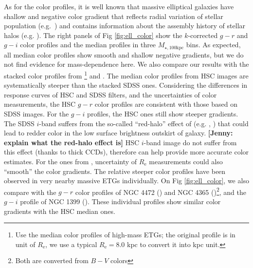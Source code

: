 \documentclass[a4paper,fleqn,usenatbib]{mnras}
\def\mtot{{$M_{\star,100\mathrm{kpc}}$}}
\newcommand{\jenny}[1]{\textcolor{Bittersweet}{\textbf{[Jenny: #1]}}}
\begin{document}
    As for the color profiles, it is well known that massive elliptical galaxies 
    have shallow and negative color gradient that reflects radial variation of 
    stellar population (e.g.\ \citealt{Carollo1993, LaBarbera2012}) and contains 
    information about the assembly history of stellar halos (e.g. 
    \citealt{Hirschmann2015}). 
    The right panels of Fig \ref{fig:ell_color} show the $k$-corrected $g-r$ and 
    $g-i$ color profiles and the median profiles in three \mtot{} bins. 
    As expected, all median color profiles show smooth and shallow negative 
    gradients, but we do not find evidence for mass-dependence here. 
    We also compare our results with the stacked color profiles from  
    \citealt{LaBarbera2010}\footnote{Use the median color profiles of high-mass 
    ETGs; the original profile is in unit of $R_{\mathrm{e}}$, we use a typical 
    $R_{\mathrm{e}}=8.0$ kpc to convert it into kpc unit.} and 
    \citealt{DSouza2014}.
    The median color profiles from HSC images are systematically steeper than the 
    stacked SDSS ones. 
    Considering the differences in response curves of HSC and SDSS filters, and 
    the uncertainties of color measurements, the HSC $g-r$ color profiles are 
    consistent with those based on SDSS images. 
    For the $g-i$ profiles, the HSC ones still show steeper gradients. 
    The SDSS $i$-band suffers from the so-called ``red-halo'' effect of 
    (e.g. \citealt{Wu2005}, \citealt{Tal2011}) that could lead to redder color in 
    the low surface brightness outskirt of galaxy.
    \jenny{explain what the red-halo effect is}
    HSC $i$-band image do not suffer from this effect (thanks to thick CCDs), 
    therefore can help provide more accurate color estimates.
    For the ones from \citet{LaBarbera2010}, uncertainty of $R_{\mathrm{e}}$ 
    measurements could also ``smooth'' the color gradients.
    The relative steeper color profiles have been observed in very nearby massive 
    ETGs individually.  
    On Fig \ref{fig:ell_color}, we also compare with the $g-r$ color profiles of 
    NGC 4472 (\citealt{Mihos2013}) and NGC 4365 (\citealt{Mihos2017})\footnote{
    Both are converted from $B-V$ colors}, and the $g-i$ profile of NGC 1399 
    (\citealt{Iodice2016}). 
    These individual profiles show similar color gradients with the HSC median ones.   
    
\end{document}

